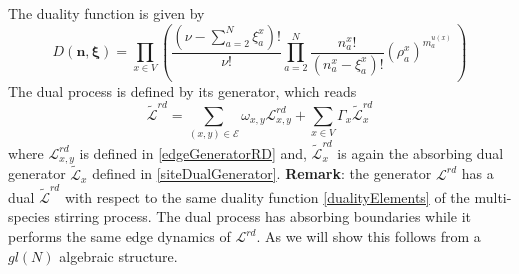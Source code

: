 \documentclass[11pt]{article}
\numberwithin{equation}{section}
\numberwithin{equation}{subsection}
\begin{document}
The duality function is given by
\begin{equation}
	D(\bm{n},\bm{\xi})=\prod_{x\in V}\left(\frac{(\nu -\sum_{a=2}^{N}\xi_{a}^{x})!}{\nu!}\prod_{a=2}^{N}\frac{n_{a}^{x}!}{(n_{a}^{x}-\xi_{a}^{x})!}\left(\rho_{a}^{x}\right)^{m_{a}^{u(x)}}\,\right)
\end{equation}
The dual process is defined by its generator, which reads
\begin{equation}\label{DualGeneratorRD}
	\widetilde{\mathcal{L}}^{rd}=\sum_{(x,y)\in \mathcal{E}}\omega_{x,y}\mathcal{L}_{x,y}^{rd}+\sum_{x\in V}\Gamma_{x}\widetilde{\mathcal{L}}_{x}^{rd}
\end{equation}
where 
$\mathcal{L}_{x,y}^{rd}$ is defined in \eqref{edgeGeneratorRD} and, $\widetilde{\mathcal{L}}_{x}^{rd}$ is again the absorbing dual generator $\widetilde{\mathcal{L}}_{x}$ defined in \eqref{siteDualGenerator}. 
\newline
\newline
\textbf{Remark}: the generator $\mathcal{L}^{rd}$ has a dual $\widetilde{\mathcal{L}}^{rd}$ with respect to the same duality function \eqref{dualityElements} of the multi-species stirring process. The dual process has absorbing boundaries while it performs the same edge dynamics of $\mathcal{L}^{rd}$. As we will show this follows from a $gl(N)$ algebraic structure. 
\end{document}
